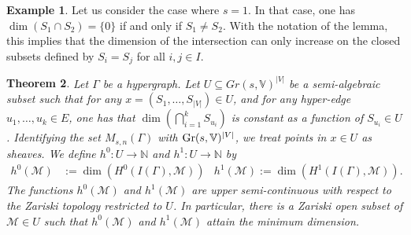 \documentclass{article}
\newtheorem{theorem}{Theorem}[section]
\theoremstyle{definition}
\newtheorem{example}[theorem]{Example}
\theoremstyle{remark}
\begin{document}
\begin{example}
    Let us consider the case where $s = 1$. In that case, one has $\dim(S_1 \cap S_2) = \{0\}$ if and only if $S_1\neq S_2$. With the notation of the lemma, this implies that the dimension of the intersection can only increase on the closed subsets defined by $S_i = S_j$ for all $i,j \in I$. 
\end{example}


\begin{theorem}\label{thm: Genericity_generalised_frameworks.}
Let $\Gamma$ be a hypergraph. Let $U \subseteq Gr(s,\mathbb{V})^{|V|}$ be a semi-algebraic subset such that for any $x=(S_1, \dots, S_{|V|}) \in U$, and for any hyper-edge $u_1, \dots, u_{k} \in E$, one has that $\dim(\bigcap_{i=1}^{k}S_{u_i})$ is constant as a function of $S_{u_i} \in U$. Identifying the set $M_{s,n}(\Gamma)$ with $\textup{Gr}(s,\mathbb{V})^{|V|}$, we treat points in $x\in U$ as sheaves. We define $h^{0}: U \rightarrow \mathbb{N}$ and $h^{1}: U \rightarrow \mathbb{N}$ by
\begin{align*}
    h^{0}(\mathcal{M})& := \dim(H^{0}(I(\Gamma), \mathcal{M})) & h^{1}(\mathcal{M}) :=  \dim(H^{1}(I(\Gamma), \mathcal{M})).
\end{align*}
 The functions $h^{0}(\mathcal{M})$ and $h^{1}(\mathcal{M})$ are upper semi-continuous with respect to the Zariski topology restricted to $U$. 
 In particular, there is a Zariski open subset of $\mathcal{M}\in U$ such that $h^{0}(\mathcal{M})$ and $h^{1}(\mathcal{M})$ attain the minimum dimension.
\end{theorem}
\end{document}
